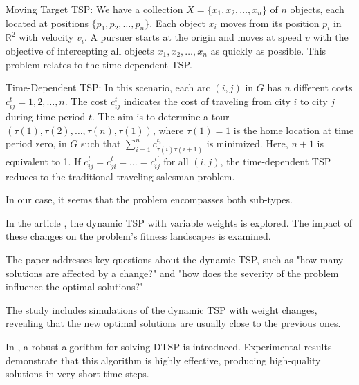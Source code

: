 Moving Target TSP: We have a collection $X = \{x_1, x_2, \ldots, x_n\}$ of $n$ objects, each located at positions $\{p_1, p_2, \ldots, p_n\}$. Each object $x_i$ moves from its position $p_i$ in $\mathbb{R}^2$ with velocity $v_i$. A pursuer starts at the origin and moves at speed $v$ with the objective of intercepting all objects $x_1, x_2, \ldots, x_n$ as quickly as possible. This problem relates to the time-dependent TSP.

Time-Dependent TSP: In this scenario, each arc $(i, j)$ in $G$ has $n$ different costs $c_{ij}^t = 1, 2, \ldots, n$. The cost $c_{ij}^t$ indicates the cost of traveling from city $i$ to city $j$ during time period $t$. The aim is to determine a tour $(\tau(1), \tau(2), \ldots, \tau(n), \tau(1))$, where $\tau(1) = 1$ is the home location at time period zero, in $G$ such that $\sum_{i=1}^{n} c_{\tau(i) \tau(i+1)}^{t_i}$ is minimized. Here, $n + 1$ is equivalent to 1. If $c_{ij}^t = c_{ji}^t = \ldots = c_{ij}^{t'}$ for all $(i, j)$, the time-dependent TSP reduces to the traditional traveling salesman problem.


In our case, it seems that the problem encompasses both sub-types.


In the article \cite{Tinos2015}, the dynamic TSP with variable weights is explored. The impact of these changes on the problem's fitness landscapes is examined.

The paper addresses key questions about the dynamic TSP, such as "how many solutions are affected by a change?" and "how does the severity of the problem influence the optimal solutions?"

The study includes simulations of the dynamic TSP with weight changes, revealing that the new optimal solutions are usually close to the previous ones.

In \cite{10.1007/11903697_31}, a robust algorithm for solving DTSP is introduced. Experimental results demonstrate that this algorithm is highly effective, producing high-quality solutions in very short time steps.


